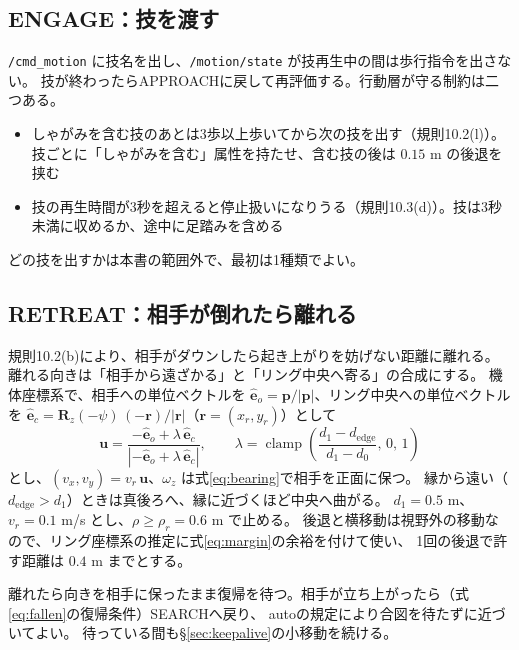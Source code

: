 \documentclass[a4paper,11pt]{ltjsarticle}
\newcommand{\vc}[1]{\bm{#1}}
\newcommand{\mat}[1]{\bm{#1}}
\newcommand{\code}[1]{\texttt{#1}}
\DeclareMathOperator{\clamp}{clamp}
\begin{document}
\subsection{ENGAGE：技を渡す}

\code{/cmd\_motion} に技名を出し、\code{/motion/state} が技再生中の間は歩行指令を出さない。
技が終わったらAPPROACHに戻して再評価する。行動層が守る制約は二つある。
\begin{itemize}
\item しゃがみを含む技のあとは3歩以上歩いてから次の技を出す（規則10.2(l)）。技ごとに「しゃがみを含む」属性を持たせ、含む技の後は $0.15$ m の後退を挟む
\item 技の再生時間が3秒を超えると停止扱いになりうる（規則10.3(d)）。技は3秒未満に収めるか、途中に足踏みを含める
\end{itemize}
どの技を出すかは本書の範囲外で、最初は1種類でよい。

\subsection{RETREAT：相手が倒れたら離れる}

規則10.2(b)により、相手がダウンしたら起き上がりを妨げない距離に離れる。
離れる向きは「相手から遠ざかる」と「リング中央へ寄る」の合成にする。
機体座標系で、相手への単位ベクトルを $\hat{\vc e}_o=\vc p/|\vc p|$、リング中央への単位ベクトルを
$\hat{\vc e}_c=\mat R_z(-\psi)\,(-\vc r)/|\vc r|$（$\vc r=(x_r,y_r)$）として
\begin{equation}
\vc u=\frac{-\hat{\vc e}_o+\lambda\,\hat{\vc e}_c}{|-\hat{\vc e}_o+\lambda\,\hat{\vc e}_c|},\qquad
\lambda=\clamp\!\left(\frac{d_1-d_\mathrm{edge}}{d_1-d_0},\,0,\,1\right)
\label{eq:retreat}
\end{equation}
とし、$(v_x,v_y)=v_r\,\vc u$、$\omega_z$ は式\eqref{eq:bearing}で相手を正面に保つ。
縁から遠い（$d_\mathrm{edge}>d_1$）ときは真後ろへ、縁に近づくほど中央へ曲がる。
$d_1=0.5$ m、$v_r=0.1$ m/s とし、$\rho\ge\rho_r=0.6$ m で止める。
後退と横移動は視野外の移動なので、リング座標系の推定に式\eqref{eq:margin}の余裕を付けて使い、
1回の後退で許す距離は $0.4$ m までとする。

離れたら向きを相手に保ったまま復帰を待つ。相手が立ち上がったら（式\eqref{eq:fallen}の復帰条件）SEARCHへ戻り、
autoの規定により合図を待たずに近づいてよい。
待っている間も\S\ref{sec:keepalive}の小移動を続ける。
\end{document}
